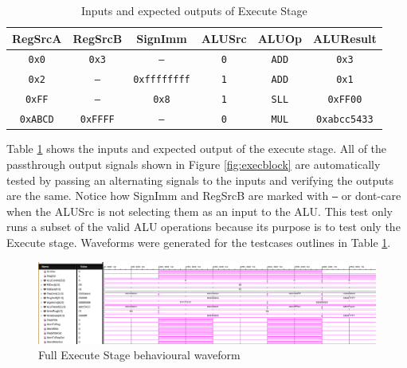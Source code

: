 \documentclass[CMPE]{../KGCOEReport}
\def\code#1{\texttt{#1}}
\begin{document}
	\begin{table}[H]
        \renewcommand{\arraystretch}{1.2}
        \setlength{\tabcolsep}{12pt}
        \caption{Inputs and expected outputs of Execute Stage}
        \begin{center}
            \begin{tabular}{|c|c|c|c|c||c|}
                \hline
RegSrcA & RegSrcB & SignImm & ALUSrc & ALUOp & ALUResult\\\hline

	\code{0x0} & \code{0x3} & \code{--} & \code{0} & \code{ADD} & \code{0x3}
	\\\hline

	\code{0x2} & \code{--} & \code{0xffffffff} & \code{1} & \code{ADD} & \code{0x1}
	\\\hline

	\code{0xFF} & \code{--} & \code{0x8} & \code{1} & \code{SLL} & \code{0xFF00}
	\\\hline

	\code{0xABCD} & \code{0xFFFF} & \code{--} & \code{0} & \code{MUL} & \code{0xabcc5433}
	\\\hline

            \end{tabular}
        \end{center}
        \label{tab:exec}
    \end{table}
	
	Table \ref{tab:exec} shows the inputs and expected output of the execute
	stage. All of the passthrough output signals shown in Figure
	\ref{fig:execblock} are automatically tested by passing an alternating
	signals to the inputs and verifying the outputs are the same. Notice how
	SignImm and RegSrcB are marked with \code{--} or dont-care when the
	ALUSrc is not selecting them as an input to the ALU. This test only runs
	a subset of the valid ALU operations because its purpose is to test only the
	Execute stage.
	Waveforms were generated for the testcases outlines in Table \ref{tab:exec}.
	
	\begin{figure}[h!]
        \centering
        \includegraphics[width=\textwidth]{img/exec_2_behav}
        \caption{Full Execute Stage behavioural waveform}
        \label{fig:exec_behav}
    \end{figure}
   	
\end{document}

